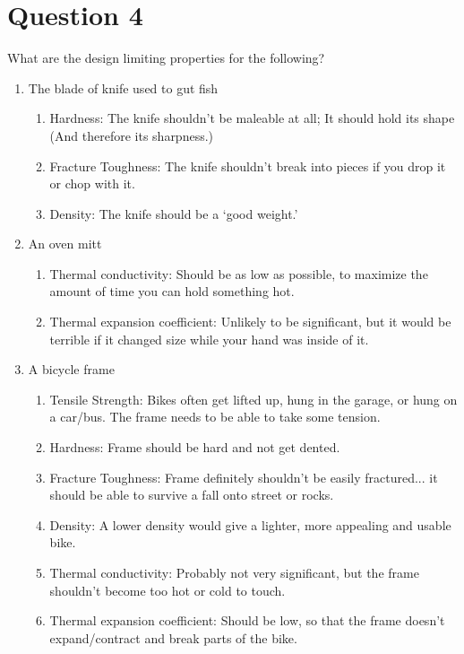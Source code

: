 \documentclass[paper=a4, fontsize=12pt]{scrartcl} %
\numberwithin{equation}{section} %
\numberwithin{figure}{section} %
\numberwithin{table}{section} %
\begin{document}
\section*{Question 4}
What are the design limiting properties for the following?
\begin{enumerate}
  \item The blade of knife used to gut fish
  \begin{enumerate}
    \item Hardness: The knife shouldn't be maleable at all; It should hold its shape (And therefore its sharpness.)
    \item Fracture Toughness: The knife shouldn't break into pieces if you drop it or chop with it.
    \item Density: The knife should be a `good weight.'
  \end{enumerate}

  \item An oven mitt
  \begin{enumerate}
    \item Thermal conductivity: Should be as low as possible, to maximize the amount of time you can hold something hot.
    \item Thermal expansion coefficient: Unlikely to be significant, but it would be terrible if it changed size while your hand was inside of it.
  \end{enumerate}

  \item A bicycle frame
  \begin{enumerate}
    \item Tensile Strength: Bikes often get lifted up, hung in the garage, or hung on a car/bus. The frame needs to be able to take some tension.
    \item Hardness: Frame should be hard and not get dented.
    \item Fracture Toughness: Frame definitely shouldn't be easily fractured... it should be able to survive a fall onto street or rocks.
    \item Density: A lower density would give a lighter, more appealing and usable bike.
    \item Thermal conductivity: Probably not very significant, but the frame shouldn't become too hot or cold to touch.
    \item Thermal expansion coefficient: Should be low, so that the frame doesn't expand/contract and break parts of the bike.
  \end{enumerate}
\end{enumerate}

\end{document}

